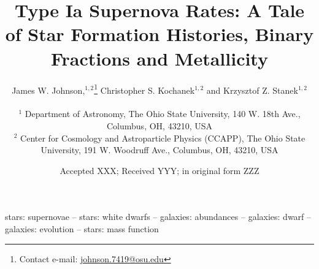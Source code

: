 \documentclass[fleqn, usenatbib]{mnras}
\title[Type Ia Supernova Rates]{Type Ia Supernova Rates: A Tale of Star
Formation Histories, Binary Fractions and Metallicity}
\author[J.W. Johnson, C.S. Kochanek \& K.Z. Stanek]{
	James W. Johnson,$^{1, 2}$\thanks{
		Contact e-mail: \href{mailto:johnson.7419@osu.edu}{johnson.7419@osu.edu}
	}
	Christopher S. Kochanek$^{1, 2}$ and
	Krzysztof Z. Stanek$^{1, 2}$
	\\ \null \\
	$^{1}$ Department of Astronomy, The Ohio State University,
	140 W. 18th Ave., Columbus, OH, 43210, USA
	\\
	$^{2}$ Center for Cosmology and Astroparticle Physics (CCAPP),
	The Ohio State University, 191 W. Woodruff Ave., Columbus, OH, 43210, USA
}
\date{Accepted XXX; Received YYY; in original form ZZZ}
\begin{document}
\label{firstpage}
\pagerange{\pageref{firstpage}--\pageref{lastpage}}
\maketitle



\begin{keywords}
stars: supernovae -- stars: white dwarfs -- galaxies: abundances -- galaxies:
dwarf -- galaxies: evolution -- stars: mass function
\end{keywords}







\label{lastpage}
\end{document}

